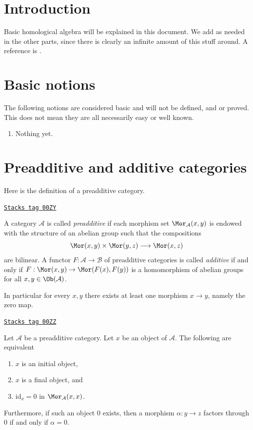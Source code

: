 \section{Introduction}
\label{homology-section-introduction}
Basic homological algebra will be explained in this document.
We add as needed in the other parts, since there is clearly
an infinite amount of this stuff around.
A reference is \cite{Maclane}.

\section{Basic notions}
\label{homology-section-topology-basic}
The following notions are considered basic and will not be defined,
and or proved. This does not mean they are all necessarily easy or
well known.

\begin{enumerate}
\item Nothing yet.
\end{enumerate}

\section{Preadditive and additive categories}
\label{homology-section-additive-categories}
Here is the definition of a preadditive category.

\begin{definition}[Preadditive]
\label{homology-definition-preadditive}
\href{https://stacks.math.columbia.edu/tag/00ZY}{\texttt{Stacks tag 00ZY}}

A category $\mathcal{A}$ is called {\it preadditive} if each
morphism set $\Mor_\mathcal{A}(x, y)$ is endowed
with the structure of an abelian group such that the
compositions
$$
\Mor(x, y) \times \Mor(y, z)
\longrightarrow
\Mor(x, z)
$$
are bilinear. A functor $F : \mathcal{A} \to \mathcal{B}$ of
preadditive categories is called {\it additive} if and only
if $F : \Mor(x, y) \to \Mor(F(x), F(y))$
is a homomorphism of abelian groups for all
$x, y \in \Ob(\mathcal{A})$.
\end{definition}

In particular for every $x, y$ there exists at least
one morphism $x \to y$, namely the zero map.

\begin{lemma}
\label{homology-lemma-preadditive-zero}
\href{https://stacks.math.columbia.edu/tag/00ZZ}{\texttt{Stacks tag 00ZZ}}

Let $\mathcal{A}$ be a preadditive category.
Let $x$ be an object of $\mathcal{A}$.
The following are equivalent
\begin{enumerate}
\item $x$ is an initial object,
\item $x$ is a final object, and
\item $\text{id}_x = 0$ in $\Mor_\mathcal{A}(x, x)$.
\end{enumerate}
Furthermore, if such an object $0$ exists, then a morphism
$\alpha : y \to z$ factors through $0$ if and only if $\alpha = 0$.
\end{lemma}

